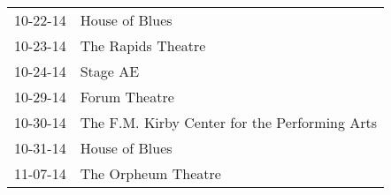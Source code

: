 \begin{supertabular}{p{0.25\columnwidth}p{0.75\columnwidth}}
 10-22-14 &                                 House of Blues \\
 10-23-14 &                             The Rapids Theatre \\
 10-24-14 &                                       Stage AE \\
 10-29-14 &                                  Forum Theatre \\
 10-30-14 &  The F.M. Kirby Center for the Performing Arts \\
 10-31-14 &                                 House of Blues \\
 11-07-14 &                            The Orpheum Theatre \\
\end{supertabular}
